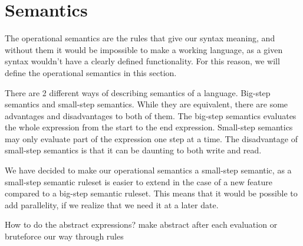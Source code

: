 \section{Semantics}
The operational semantics are the rules that give our syntax meaning, and without them it would be impossible to make a working language, as a given syntax wouldn't have a clearly defined functionality. For this reason, we will define the operational semantics in this section.

There are 2 different ways of describing semantics of a language. Big-step semantics and small-step semantics. While they are equivalent, there are some advantages and disadvantages to both of them. The big-step semantics evaluates the whole expression from the start to the end expression. Small-step semantics may only evaluate part of the expression one step at a time. The disadvantage of small-step semantics is that it can be daunting to both write and read.

We have decided to make our operational semantics a small-step semantic, as a small-step semantic ruleset is easier to extend in the case of a new feature compared to a big-step semantic ruleset. This means that it would be possible to add parallelity, if we realize that we need it at a later date.


How to do the abstract expressions? make abstract after each evaluation or bruteforce our way through rules

